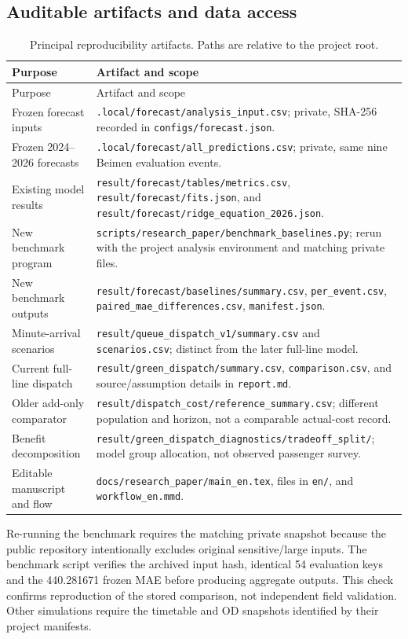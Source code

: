 \subsection{Auditable artifacts and data access}
\begin{longtable}{p{54mm}p{94mm}}
\caption{Principal reproducibility artifacts. Paths are relative to the project root.}\label{tab:paths}\\
\toprule
Purpose & Artifact and scope\\\midrule\endfirsthead
\toprule Purpose & Artifact and scope\\\midrule\endhead
Frozen forecast inputs & \texttt{.local/forecast/analysis\_input.csv}; private, SHA-256 recorded in \texttt{configs/forecast.json}.\\
Frozen 2024--2026 forecasts & \texttt{.local/forecast/all\_predictions.csv}; private, same nine Beimen evaluation events.\\
Existing model results & \texttt{result/forecast/tables/metrics.csv}, \texttt{result/forecast/fits.json}, and \texttt{result/forecast/ridge\_equation\_2026.json}.\\
New benchmark program & \texttt{scripts/research\_paper/benchmark\_baselines.py}; rerun with the project analysis environment and matching private files.\\
New benchmark outputs & \texttt{result/forecast/baselines/summary.csv}, \texttt{per\_event.csv}, \texttt{paired\_mae\_differences.csv}, \texttt{manifest.json}.\\
Minute-arrival scenarios & \texttt{result/queue\_dispatch\_v1/summary.csv} and \texttt{scenarios.csv}; distinct from the later full-line model.\\
Current full-line dispatch & \texttt{result/green\_dispatch/summary.csv}, \texttt{comparison.csv}, and source/assumption details in \texttt{report.md}.\\
Older add-only comparator & \texttt{result/dispatch\_cost/reference\_summary.csv}; different population and horizon, not a comparable actual-cost record.\\
Benefit decomposition & \texttt{result/green\_dispatch\_diagnostics/tradeoff\_split/}; model group allocation, not observed passenger survey.\\
Editable manuscript and flow & \texttt{docs/research\_paper/main\_en.tex}, files in \texttt{en/}, and \texttt{workflow\_en.mmd}.\\\bottomrule
\end{longtable}
Re-running the benchmark requires the matching private snapshot because the public repository intentionally excludes original sensitive/large inputs. The benchmark script verifies the archived input hash, identical 54 evaluation keys and the 440.281671 frozen MAE before producing aggregate outputs. This check confirms reproduction of the stored comparison, not independent field validation. Other simulations require the timetable and OD snapshots identified by their project manifests.

